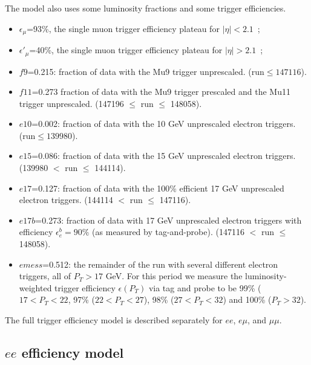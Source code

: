 The model also uses some luminosity fractions and some trigger 
efficiencies.

\begin{itemize}

\item $\epsilon_{\mu}$=93\%, the single muon trigger efficiency plateau 
for $|\eta|<2.1$~\cite{ref:evans};

\item $\epsilon'_{\mu}$=40\%, the single muon trigger efficiency plateau 
for $|\eta|>2.1$~\cite{ref:evans};

\item $f9$=0.215: fraction of data with the Mu9 trigger unprescaled.  
(run$\le 147116$).

\item $f11$=0.273 fraction of data with the Mu9 trigger prescaled and
the Mu11 trigger unprescaled.
(147196 $\leq$ run $\leq$ 148058).

\item $e10$=0.002: fraction of data with the 10 GeV unprescaled electron triggers.
(run$\le 139980$).

\item $e15$=0.086: fraction of data with the 15 GeV unprescaled electron triggers.
(139980 $<$ run $\leq$ 144114).

\item $e17$=0.127: fraction of data with the 100\% efficient 17 GeV unprescaled electron triggers.
(144114 $<$ run $\leq$ 147116).

\item $e17b$=0.273: fraction of data with 17 GeV unprescaled electron triggers
with efficiency $\epsilon_e^b=90\%$ (as measured by tag-and-probe).
(147116 $<$ run $\leq$ 148058).

\item $emess$=0.512: the remainder of the run with several different electron
triggers, all of $P_T>17$ GeV.  For this period we measure the 
luminosity-weighted
trigger efficiency $\epsilon(P_T)$ via tag and probe to be 99\% 
($17<P_T<22$, 97\% ($22<P_T<27$), 98\% ($27<P_T<32$) and
100\% ($P_T>32$).

\end{itemize}

The full trigger efficiency model is described separately for 
$ee$, $e\mu$, and $\mu\mu$.

\subsection{$ee$ efficiency model}
\label{sec:eemodel}

